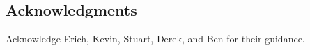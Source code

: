 
\subsection*{Acknowledgments}

Acknowledge Erich, Kevin, Stuart, Derek, and Ben for their guidance.
